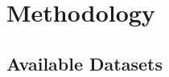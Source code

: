 \documentclass[report.tex]{subfiles}
\begin{document}
    \chapter{Methodology}
    \section{Available Datasets}
    \label{sec:available_datasets}

\end{document}

